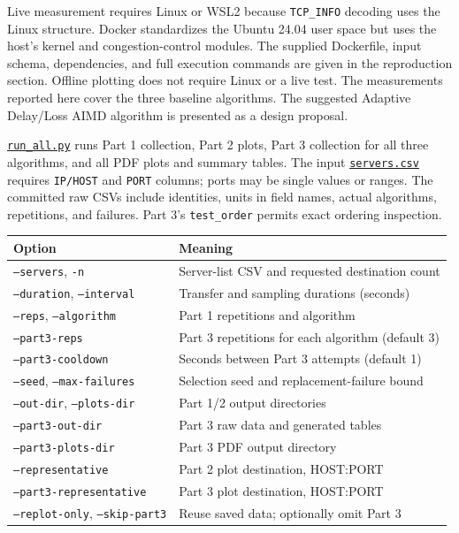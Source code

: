 \documentclass[11pt,letterpaper]{article}
\newcommand{\codelink}[2]{\href{https://github.com/RohMalpani/CS422Assignments/blob/main/assignment2/#2}{#1}}
\begin{document}
Live measurement requires Linux or WSL2 because \texttt{TCP\_INFO} decoding
uses the Linux structure. Docker standardizes the Ubuntu 24.04 user space but
uses the host's kernel and congestion-control modules. The supplied Dockerfile,
input schema, dependencies, and full execution commands are given in the
reproduction section. Offline plotting does not require Linux or a live test.
The measurements reported here cover the three baseline algorithms. The
suggested Adaptive Delay/Loss AIMD algorithm is presented as a design proposal.


\codelink{\texttt{run\_all.py}}{run_all.py} runs Part 1 collection, Part 2 plots,
Part 3 collection for all three algorithms, and all PDF plots and summary tables.
The input \codelink{\texttt{servers.csv}}{servers.csv} requires \texttt{IP/HOST}
and \texttt{PORT} columns; ports may be single values or ranges. The committed
raw CSVs include identities, units in field names, actual algorithms, repetitions,
and failures. Part 3's \texttt{test\_order} permits exact ordering inspection.

\begin{center}\small
\begin{tabular}{ll}
\hline
Option & Meaning \\
\hline
\texttt{--servers}, \texttt{-n} & Server-list CSV and requested destination count \\
\texttt{--duration}, \texttt{--interval} & Transfer and sampling durations (seconds) \\
\texttt{--reps}, \texttt{--algorithm} & Part 1 repetitions and algorithm \\
\texttt{--part3-reps} & Part 3 repetitions for each algorithm (default 3) \\
\texttt{--part3-cooldown} & Seconds between Part 3 attempts (default 1) \\
\texttt{--seed}, \texttt{--max-failures} & Selection seed and replacement-failure bound \\
\texttt{--out-dir}, \texttt{--plots-dir} & Part 1/2 output directories \\
\texttt{--part3-out-dir} & Part 3 raw data and generated tables \\
\texttt{--part3-plots-dir} & Part 3 PDF output directory \\
\texttt{--representative} & Part 2 plot destination, HOST:PORT \\
\texttt{--part3-representative} & Part 3 plot destination, HOST:PORT \\
\texttt{--replot-only}, \texttt{--skip-part3} & Reuse saved data; optionally omit Part 3 \\
\hline
\end{tabular}\end{center}
\end{document}
